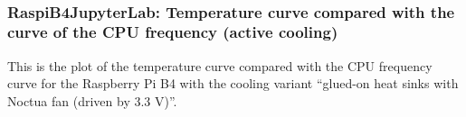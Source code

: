 \documentclass [oneside,10pt,a4paper,ngerman,BCOR10mm,headsepline,parindent,final]{scrartcl}
\begin{document}
    \begin{center}
    \end{center}
    { \hspace*{\fill} \\}
    
    \hypertarget{raspib4jupyterlab-temperature-curve-compared-with-the-curve-of-the-cpu-frequency-active-cooling}{%
\subsubsection{RaspiB4JupyterLab: Temperature curve compared with the
curve of the CPU frequency (active
cooling)}\label{raspib4jupyterlab-temperature-curve-compared-with-the-curve-of-the-cpu-frequency-active-cooling}}

This is the plot of the temperature curve compared with the CPU
frequency curve for the Raspberry Pi B4 with the cooling variant
``glued-on heat sinks with Noctua fan (driven by 3.3 V)''.
\end{document}
